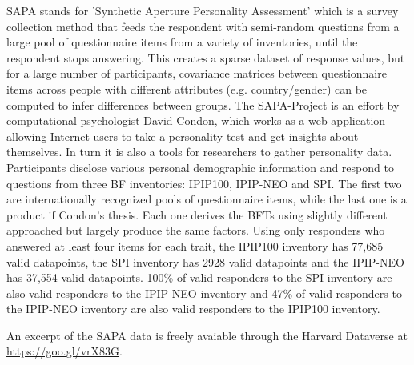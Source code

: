SAPA stands for 'Synthetic Aperture Personality Assessment' which is a survey collection method that feeds the respondent with semi-random questions from a large pool of questionnaire items from a variety of inventories, until the respondent stops answering. This creates a sparse dataset of response values, but for a large number of participants, covariance matrices between questionnaire items across people with different attributes (e.g. country/gender) can be computed to infer differences between groups.
The SAPA-Project is an effort by computational psychologist David Condon, which works as a web application allowing Internet users to take a personality test and get insights about themselves. In turn it is also a tools for researchers to gather personality data. Participants disclose various personal demographic information and respond to questions from three BF inventories: IPIP100, IPIP-NEO and SPI. The first two are internationally recognized pools of questionnaire items, while the last one is a product if Condon's thesis. Each one derives the BFTs using slightly different approached but largely produce the same factors. Using only responders who answered at least four items for each trait, the IPIP100 inventory has 77,685 valid datapoints, the SPI inventory has 2928 valid datapoints and the IPIP-NEO has 37,554 valid datapoints. 100\% of valid responders to the SPI inventory are also valid responders to the IPIP-NEO inventory and 47\% of valid responders to the IPIP-NEO inventory are also valid responders to the IPIP100 inventory.

An excerpt of the SAPA data is freely avaiable through the Harvard Dataverse at \url{https://goo.gl/vrX83G}.

